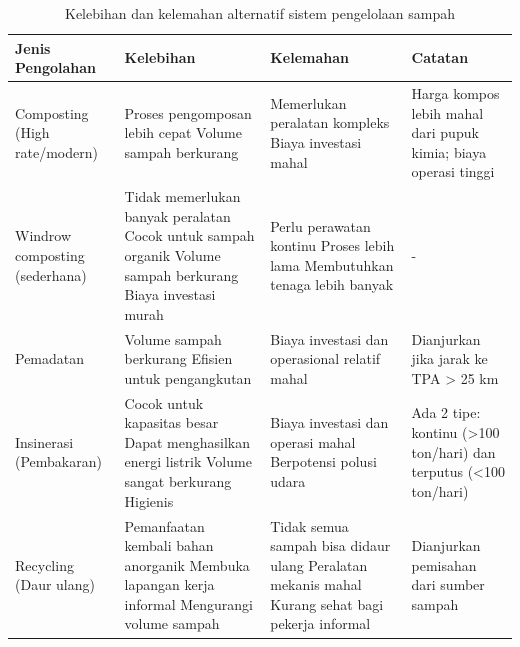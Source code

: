 \documentclass[../wastek.tex]{subfiles}
\begin{document}
\begin{table}[htb]
	\caption{Kelebihan dan kelemahan alternatif sistem pengelolaan sampah}
	\label{tb:nome}
	\begin{tabularx}{\textwidth}{p{3cm} X X X}
		\hline
		Jenis Pengolahan                               &  Kelebihan  &  Kelemahan  &  Catatan  \\
		\hline

		Composting (High rate/modern)                  &
		\tabitem Proses pengomposan lebih cepat
		\tabitem Volume sampah berkurang               &
		\tabitem Memerlukan peralatan kompleks
		\tabitem Biaya investasi mahal                 &
		Harga kompos lebih mahal dari pupuk kimia; biaya operasi tinggi  \\[0.5em]

		Windrow composting (sederhana)                 &
		\tabitem Tidak memerlukan banyak peralatan
		\tabitem Cocok untuk sampah organik
		\tabitem Volume sampah berkurang
		\tabitem Biaya investasi murah                 &
		\tabitem Perlu perawatan kontinu
		\tabitem Proses lebih lama
		\tabitem Membutuhkan tenaga lebih banyak       &
		-  \\[0.5em]

		Pemadatan                                      &
		\tabitem Volume sampah berkurang
		\tabitem Efisien untuk pengangkutan            &
		Biaya investasi dan operasional relatif mahal  &
		Dianjurkan jika jarak ke TPA > 25 km  \\[0.5em]

		Insinerasi (Pembakaran)                        &
		\tabitem Cocok untuk kapasitas besar
		\tabitem Dapat menghasilkan energi listrik
		\tabitem Volume sangat berkurang
		\tabitem Higienis                              &
		\tabitem Biaya investasi dan operasi mahal
		\tabitem Berpotensi polusi udara               &
		Ada 2 tipe: kontinu (>100 ton/hari) dan terputus (<100 ton/hari)  \\[0.5em]

		Recycling (Daur ulang)                         &
		\tabitem Pemanfaatan kembali bahan anorganik
		\tabitem Membuka lapangan kerja informal
		\tabitem Mengurangi volume sampah              &
		\tabitem Tidak semua sampah bisa didaur ulang
		\tabitem Peralatan mekanis mahal
		\tabitem Kurang sehat bagi pekerja informal    &
		Dianjurkan pemisahan dari sumber sampah  \\

		\hline
	\end{tabularx}
\end{table}
\end{document}
